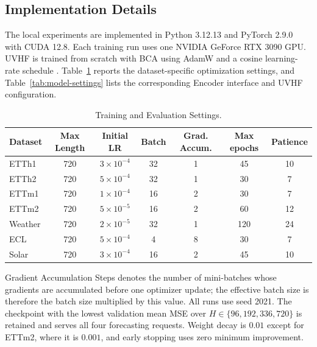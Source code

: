 \documentclass[final,3p,times]{elsarticle}
\newif\ifshowrevisions
\newcommand{\rev}[1]{\ifshowrevisions\textcolor{revisionblue}{#1}\else#1\fi}
\begin{document}
\subsection{Implementation Details}


The local experiments are implemented in Python 3.12.13 and PyTorch 2.9.0 with CUDA 12.8. Each training run uses one NVIDIA GeForce RTX 3090 GPU. \rev{UVHF is trained from scratch with BCA} using AdamW and a cosine learning-rate schedule \citep{loshchilov2019adamw,loshchilov2017sgdr}. Table~\ref{tab:training-settings} reports the dataset-specific optimization settings, and Table~\ref{tab:model-settings} lists the corresponding Encoder interface and \rev{UVHF configuration}.

\begin{table}[t]
\centering
\scriptsize
\setlength{\tabcolsep}{4pt}
\caption{Training and Evaluation Settings.}
\label{tab:training-settings}
\begin{tabular}{lcccccc}
\toprule
Dataset & Max Length & Initial LR & Batch & Grad. Accum. & Max epochs & Patience \\
\midrule
ETTh1 & 720 & $3\times10^{-4}$ & 32 & 1 & 45 & 10 \\
ETTh2 & 720 & $5\times10^{-4}$ & 32 & 1 & 30 & 7 \\
ETTm1 & 720 & $1\times10^{-4}$ & 16 & 2 & 30 & 7 \\
ETTm2 & 720 & $5\times10^{-5}$ & 16 & 2 & 60 & 12 \\
Weather & 720 & $2\times10^{-5}$ & 32 & 1 & 120 & 24 \\
ECL & 720 & $5\times10^{-4}$ & 4 & 8 & 30 & 7 \\
Solar & 720 & $3\times10^{-4}$ & 16 & 2 & 45 & 10 \\
\bottomrule
\end{tabular}
\end{table}


Gradient Accumulation Steps denotes the number of mini-batches whose gradients are accumulated before one optimizer update; the effective batch size is therefore the batch size multiplied by this value. All runs use seed 2021. The checkpoint with the lowest validation mean MSE over $H\in\{96,192,336,720\}$ is retained and serves all four forecasting requests. Weight decay is $0.01$ except for ETTm2, where it is $0.001$, and early stopping uses zero minimum improvement.
\end{document}

